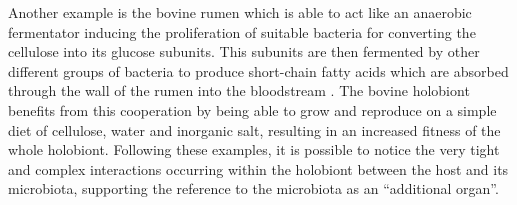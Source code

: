 Another example is the bovine rumen which is able to act like an anaerobic fermentator inducing the proliferation of suitable bacteria for converting the cellulose into its glucose subunits. This subunits are then fermented by other different groups of bacteria to produce short-chain fatty acids which are absorbed through the wall of the rumen into the bloodstream \cite{dehority2003rumen}. The bovine holobiont benefits from this cooperation by being able to grow and reproduce on a simple diet of cellulose, water and inorganic salt, resulting in an increased fitness of the whole holobiont. Following these examples, it is possible to notice the very tight and complex interactions occurring within the holobiont between the host and its microbiota, supporting the reference to the microbiota as an ``additional organ''.\\

